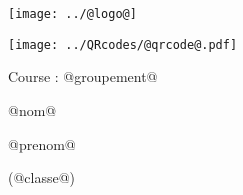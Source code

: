 \Huge

\begin{block} %
{}\hfill {}
{}\hfill {}
\begin{minipage}{0.15\linewidth}
\texttt{[image: ../@logo@]}
\end{minipage}
{}\hfill {}



\begin{minipage}{0.48\linewidth}
\texttt{[image: ../QRcodes/@qrcode@.pdf]}

\vspace{0.5cm}

Course : @groupement@
\end{minipage}
\begin{minipage}{0.5\linewidth}
{}\hfill {}
{}\hfill {}

\bigskip

\begin{center}
@nom@

@prenom@

(@classe@)
\end{center}
\end{minipage}



\end{block}

\vfill


\vfill
